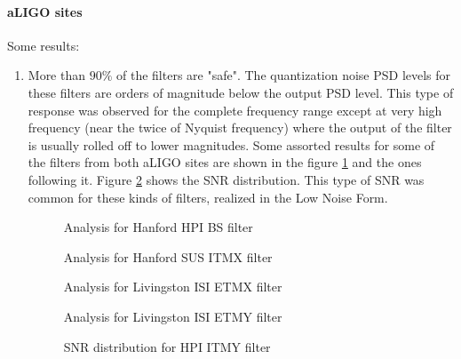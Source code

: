 \documentclass[colorlinks=true,pdfstartview=FitV,linkcolor=blue,
            citecolor=red,urlcolor=magenta]{ligodoc}
\begin{document}
		\paragraph{aLIGO sites} Some results:
	\begin{enumerate}
		\item More than $90\%$ of the filters are "safe". The quantization noise PSD levels for these filters are orders of magnitude below the output PSD level. This type of response was observed for the complete frequency range except at very high frequency (near the twice of Nyquist frequency) where the output of the filter is usually rolled off to lower magnitudes. Some assorted results for some of the filters from both aLIGO sites are shown in the figure \ref{good} and the ones following it. Figure \ref{good_snr} shows the SNR distribution. This type of SNR was common for these kinds of filters, realized in the Low Noise Form.
		\begin{figure}[H]
 
			  \centering
			  
			  \def\svgscale{0.5}
			  \tiny{
			  
			  }
			  \caption{Analysis for Hanford HPI BS filter}
			 \label{good}
		\end{figure}
		\begin{figure}[H]
 
			  \centering
			  \def\svgscale{0.5}
			  \tiny{
			  
			  }
			  \caption{Analysis for Hanford SUS ITMX filter}
		\end{figure}
		\begin{figure}[H]
 
			  \centering
			  \def\svgscale{0.5}		 
			  \tiny{ 
			  
			  }
			  \caption{Analysis for Livingston ISI ETMX filter}
		\end{figure}
		\begin{figure}[H]
 
			  \centering
			  \def\svgscale{0.5}
			  \tiny{
			  
			  }
			  \caption{Analysis for Livingston ISI ETMY filter}
		\end{figure}
		\begin{figure}[H]
 
			  \centering
			  \def\svgscale{0.5}
			  \tiny{
			  
			  }
			  \caption{SNR distribution for HPI ITMY filter}
			 \label{good_snr}
		\end{figure}
		

\end{enumerate}
\end{document}
